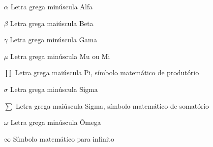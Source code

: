 \begin{simbolos}
    \item[$ \alpha $] Letra grega minúscula Alfa
    \item[$ \beta $] Letra grega maiúscula Beta
    \item[$ \gamma $] Letra grega minúscula Gama
    \item[$ \mu $]    Letra grega minúscula Mu ou Mi
    \item[$ \prod $]  Letra grega maiúscula Pi, símbolo matemático de produtório
    \item[$ \sigma $] Letra grega minúscula Sigma
    \item[$ \sum $]   Letra grega maiúscula Sigma, símbolo matemático de somatório
    \item[$ \omega $] Letra grega minúscula Ômega
    \item[$ \infty $] Símbolo matemático para infinito
\end{simbolos}
